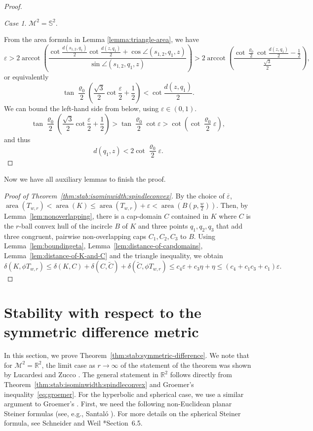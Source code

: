 \documentclass[12pt,reqno]{amsart}
\theoremstyle{remark}
\newtheorem{case}{Case}
\newcommand{\R}{{\mathbb R}}
\newcommand{\sph}{{\mathbb S}}
\newcommand{\M}{\mathcal{M}}
\DeclareMathOperator{\arccot}{\mathrm{arccot}}
\DeclareMathOperator{\area}{\mathrm{area}}
\begin{document}
\begin{proof}
\begin{case}
    $\M^2=\sph^2$.
\end{case}

From the area formula in Lemma \ref{lemma:triangle-area}, we have
\[
\varepsilon>2\arccot\left(\frac{\cot\frac{d(s_{1,2},q_1)}{2}\cot\frac{d(z,q_1)}{2}+\cos\angle(s_{1,2},q_1,z)}{\sin\angle(s_{1,2},q_1,z)}\right)>2\arccot\left(\frac{\cot\frac{\varrho_0}{2}\cot\frac{d(z,q_1)}{2}-\frac{1}{2}}{\frac{\sqrt{3}}{2}}\right),
\]
or equivalently
\[
\tan\frac{\varrho_0}{2}\left(\frac{\sqrt{3}}{2}\cot\frac{\varepsilon}{2}+\frac{1}{2}\right)<\cot\frac{d(z,q_1)}{2}.
\]
We can bound the left-hand side from below, using $\varepsilon\in(0,1)$.
\[
\tan\frac{\varrho_0}{2}\left(\frac{\sqrt{3}}{2}\cot\frac{\varepsilon}{2}+\frac{1}{2}\right)>\tan\frac{\varrho_0}{2}\cot\varepsilon>\cot\left(\cot\frac{\varrho_0}{2}\varepsilon\right),
\]
and thus
\[
d(q_1,z)<2\cot\frac{\varrho_0}{2}\varepsilon.
\]
\end{proof}

Now we have all auxiliary lemmas to finish the proof.

\begin{proof}[Proof of Theorem~\ref{thm:stab:isominwidth:spindleconvex}]
By the choice of $\overline{\varepsilon}$, $\area(T_{w,r})<\area(K)\leq\area(T_{w,r})+\varepsilon<\area(B(p,\frac{w}{2}))$. Then, by Lemma~\ref{lem:nonoverlapping}, there is a cap-domain $C$ contained in $K$ where $C$ is the $r$-ball convex hull of the incircle $B$ of $K$ and three points $q_1,q_2,q_3$ that add three congruent, pairwise non-overlapping caps $C_1,C_2,C_3$ to $B$. Using Lemma~\ref{lem:boundingeta}, Lemma~\ref{lem:distance-of-capdomains}, Lemma~\ref{lem:distance-of-K-and-C} and the triangle inequality, we obtain
\[
\delta(K,\phi T_{w,r})\leq \delta(K,C)+\delta(C,\widetilde{C})+\delta(\widetilde{C},\phi T_{w,r})\leq c_4\varepsilon+c_3\eta+\eta\leq(c_4+c_1c_3+c_1)\varepsilon.
\]
\end{proof}

\section{Stability with respect to the symmetric difference metric}\label{sec:symmetric-difference}

In this section, we prove Theorem~\ref{thm:stab:symmetric-difference}. We note that for $\M^2=\R^2$, the limit case as $r\to\infty$ of the statement of the theorem was shown by Lucardesi and Zucco \cite{LZ24}. The general statement in $\R^2$ follows directly from Theorem~\ref{thm:stab:isominwidth:spindleconvex} and Groemer's inequality~\eqref{eq:groemer}. For the hyperbolic and spherical case, we use a similar argument to Groemer's \cite{G00}. First, we need the following non-Euclidean planar Steiner formulas (see, e.g., Santal\'o \cite{S04}). For more details on the spherical Steiner formula, see Schneider and Weil \cite{SW08}*{Section~6.5}.
\end{document}
